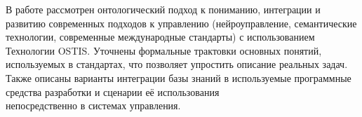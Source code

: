 \documentclass[7pt]{article} \twocolumn
\begin{document}
\par В работе рассмотрен онтологический подход к пониманию,
интеграции и развитию современных подходов к управлению
(нейроуправление, семантические технологии, современные
международные стандарты) с использованием Технологии
OSTIS. Уточнены формальные трактовки основных понятий,
используемых в стандартах, что позволяет упростить описание реальных задач. Также описаны варианты интеграции
базы знаний в используемые программные средства разработки и сценарии её использования \\ непосредственно в системах
управления. \\

\end{document}
